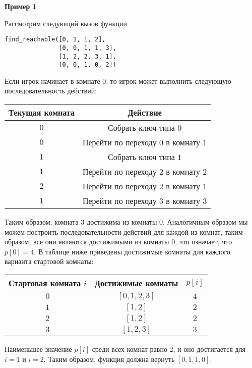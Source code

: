 \textbf{Пример 1}

Рассмотрим следующий вызов функции
\begin{verbatim}
find_reachable([0, 1, 1, 2],
               [0, 0, 1, 1, 3], 
               [1, 2, 2, 3, 1], 
               [0, 0, 1, 0, 2])
\end{verbatim}

Если игрок начинает в комнате $0$, то игрок может выполнить следующую последовательность действий:

\begin{center}
\renewcommand{\arraystretch}{1.5}
\begin{tabular}{|c|c|}
\hline
Текущая комната & Действие \\
\hline
$0$ & Собрать ключ типа $0$ \\
\hline
$0$ & Перейти по переходу $0$ в комнату $1$ \\
\hline
$1$ & Собрать ключ типа $1$ \\
\hline
$1$ & Перейти по переходу $2$ в комнату $2$ \\
\hline
$2$ & Перейти по переходу $2$ в комнату $1$ \\
\hline
$1$ & Перейти по переходу $3$ в комнату $3$ \\
\hline
\end{tabular}
\end{center}

Таким образом, комната $3$ достижима из комнаты $0$.
Аналогичным образом мы можем построить последовательности действий для каждой из комнат, таким образом, все они являются достижимыми из комнаты $0$, что означает, что  $p[0]=4$.
В таблице ниже приведены достижимые комнаты для каждого варианта стартовой комнаты:

\begin{center}
\renewcommand{\arraystretch}{1.5}
\begin{tabular}{|c|c|c|}
\hline
Стартовая комната $i$ & Достижимые комнаты & $p[i]$ \\
\hline
$0$ & $[0,1,2,3]$ & $4$\\
\hline
$1$ & $[1,2]$ & $2$\\
\hline
$2$ & $[1,2]$ & $2$\\
\hline
$3$ & $[1,2,3]$ & $3$\\
\hline
\end{tabular}
\end{center}
Наименьшее значение $p[i]$ среди всех комнат равно $2$, и оно достигается для $i=1$ и $i=2$. Таким образом, функция должна вернуть $[0,1,1,0]$.



